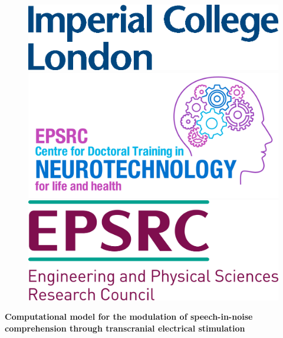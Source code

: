 \documentclass[a0,portrait]{a0poster}
\begin{document}

\begin{figure}[!htb]
  \begin{flushleft}
  \includegraphics[height=0.03\textheight,keepaspectratio]{ICL.eps}
  \end{flushleft}
\endminipage\hfill
{}
  \centering
  \includegraphics[height=0.03\textheight,keepaspectratio]{CDT.png}
\endminipage\hfill
{}%
  \begin{flushright}
  \includegraphics[height=0.03\textheight,keepaspectratio]{EPSRC.png}
  \end{flushright}
\endminipage
\end{figure}
\vspace{0.2cm}
\centering
\veryHuge \color{Black} \textbf{Computational model for the modulation of speech-in-noise comprehension through transcranial electrical stimulation} \color{Black}\\[0.5cm] %
\end{document}
